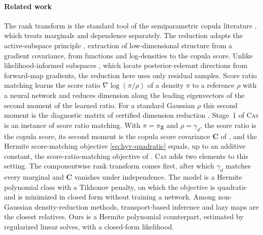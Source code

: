 \documentclass[review,hidelinks,onefignum,onetabnum]{siamart251216}
\newcommand{\gauss}{\gamma}
\newcommand{\mC}{\bm{C}}
\newcommand{\vZ}{\bm{Z}}
\begin{document}
\paragraph{Related work} The rank transform is the standard tool of the semiparametric copula literature \cite{Sklar1959, Nelsen2006book, LiuLaffertyWasserman2009nonparanormal}, which treats marginals and dependence separately. The reduction adapts the active-subspace principle \cite{ConstantineDowWang2014, Constantine2015book, ZahmConstantinePrieurMarzouk2020, BigoniMarzoukPrieurZahm2022}, extraction of low-dimensional structure from a gradient covariance, from functions and log-densities to the copula score. Unlike likelihood-informed subspaces \cite{CuiMartinMarzoukSolonenSpantini2014, ZahmCuiLawSpantiniMarzouk2022, CuiTongZahm2022}, which locate posterior-relevant directions from forward-map gradients, the reduction here uses only residual samples. Score ratio matching \cite{BaptistaBrennanMarzouk2025} learns the score ratio $\nabla\log(\pi/\rho)$ of a density $\pi$ to a reference $\rho$ with a neural network and reduces dimension along the leading eigenvectors of the second moment of the learned ratio. For a standard Gaussian $\rho$ this second moment is the diagnostic matrix of certified dimension reduction \cite{ZahmCuiLawSpantiniMarzouk2022}. Stage~1 of \textsc{Cas} is an instance of score ratio matching. With $\pi = \pi_{\vZ}$ and $\rho = \gauss_d$, the score ratio is the copula score, its second moment is the copula score covariance $\mC$ of , and the Hermite score-matching objective \eqref{eq:hyv-quadratic} equals, up to an additive constant, the score-ratio-matching objective of \cite[Thm.~3.2]{BaptistaBrennanMarzouk2025}. \textsc{Cas} adds two elements to this setting. The componentwise rank transform comes first, after which $\gauss_d$ matches every marginal and $\mC$ vanishes under independence. The model is a Hermite polynomial class with a Tikhonov penalty, on which the objective is quadratic and is minimized in closed form without training a network. Among non-Gaussian density-reduction methods, transport-based inference and lazy maps \cite{MarzoukMoselhyParnoSpantini2016, MorrisonBaptistaMarzouk2017, BaptistaMarzoukZahm2023representation, BrennanBigoniZahmSpantiniMarzouk2020} are the closest relatives. Ours is a Hermite polynomial counterpart, estimated by regularized linear solves, with a closed-form likelihood.
\end{document}

